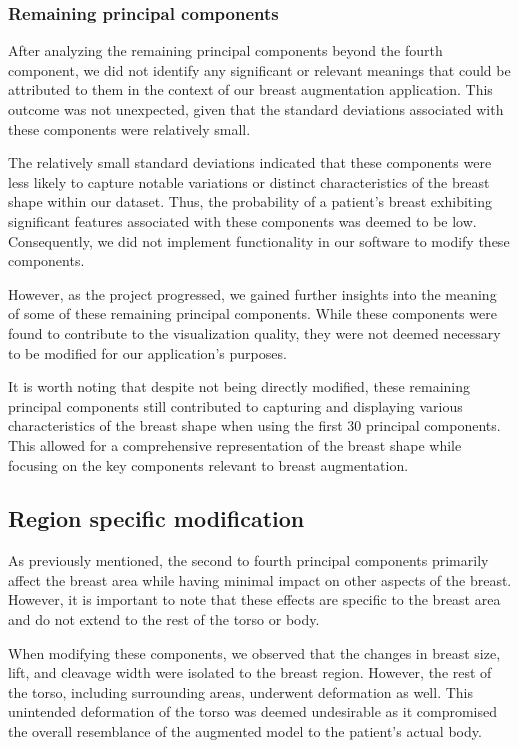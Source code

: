 \subsubsection{Remaining principal components}

After analyzing the remaining principal components beyond the fourth component, we did not identify any significant or relevant meanings that could be attributed to them in the context of our breast 
augmentation application. This outcome was not unexpected, given that the standard deviations associated with these components were relatively small.

The relatively small standard deviations indicated that these components were less likely to capture notable variations or distinct characteristics of the breast shape within our dataset. 
Thus, the probability of a patient's breast exhibiting significant features associated with these components was deemed to be low. Consequently, we did not implement functionality in our 
software to modify these components.

However, as the project progressed, we gained further insights into the meaning of some of these remaining principal components. While these components were found to contribute to the 
visualization quality, they were not deemed necessary to be modified for our application's purposes.

It is worth noting that despite not being directly modified, these remaining principal components still contributed to capturing and displaying various characteristics of the breast 
shape when using the first 30 principal components. This allowed for a comprehensive representation of the breast shape while focusing on the key components relevant to breast augmentation.

\subsection{Region specific modification}

As previously mentioned, the second to fourth principal components primarily affect the breast area while having minimal impact on other aspects of the breast. 
However, it is important to note that these effects are specific to the breast area and do not extend to the rest of the torso or body.

When modifying these components, we observed that the changes in breast size, lift, and cleavage width were isolated to the breast region. 
However, the rest of the torso, including surrounding areas, underwent deformation as well. This unintended deformation of the torso was deemed undesirable as it compromised the overall 
resemblance of the augmented model to the patient's actual body.

